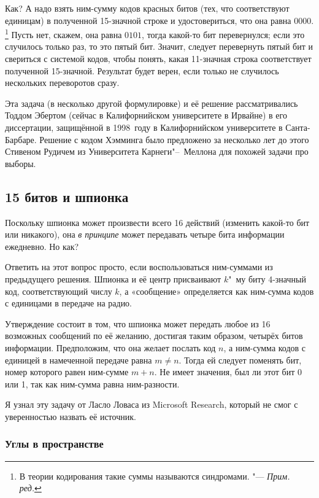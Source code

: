\documentclass[twoside]{book}
\begin{document}
Как? А надо взять ним-сумму кодов красных битов (тех, что соответствуют единицам) в полученной 15-значной строке и удостовериться, что она равна $0000$. \footnote{В теории кодирования такие суммы называются синдромами. "--- \emph{Прим. ред.}}
Пусть нет, скажем, она равна $0101$,
тогда какой-то бит перевернулся;
если это случилось только раз, то это пятый бит.
Значит, следует перевернуть пятый бит и свериться с системой кодов, чтобы понять, какая 11-значная строка соответствует полученной 15-значной.
Результат будет верен, если только не случилось нескольких переворотов сразу.

\medskip

Эта задача (в несколько другой формулировке) и её решение рассматривались Тоддом Эбертом (сейчас в Калифорнийском университете в Ирвайне) в его диссертации, защищённой в 1998~году в Калифорнийском университете в Санта-Барбаре.
Решение с кодом Хэмминга было предложено за несколько лет до этого Стивеном Рудичем из Университета Карнеги"--~Меллона  для похожей задачи про выборы.

\subsection*{15 битов и шпионка}

Поскольку шпионка может произвести всего 16 действий (изменить какой-то бит или никакого),  она \emph{в принципе} может передавать четыре бита информации ежедневно.
Но как?

Ответить на этот вопрос просто, если воспользоваться ним-суммами из предыдущего решения.
Шпионка и её центр присваивают $k$"~му биту 4-значный код, соответствующий числу $k$, а «сообщение» определяется как ним-сумма кодов с единицами в передаче на радио.

Утверждение состоит в том, что шпионка может передать любое из 16 возможных сообщений по её желанию,
достигая таким образом, четырёх битов информации.
Предположим, что она желает послать код $n$, а ним-сумма кодов с единицей в намеченной передаче равна $m\ne n$.
Тогда ей следует поменять бит, номер которого равен ним-сумме $m+n$.
Не имеет значения, был ли этот бит 0 или 1, так как ним-сумма равна ним-разности.
\heart

\medskip

Я узнал эту задачу от Ласло Ловаса из Microsoft Research, который не смог с уверенностью назвать её источник.

\subsubsection*{Углы в пространстве}
\end{document}
